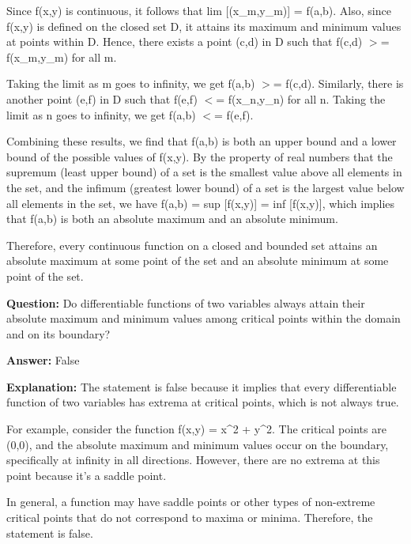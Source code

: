 \documentclass{article}
\begin{document}
Since f(x,y) is continuous, it follows that lim [(x\_m,y\_m)] = f(a,b). Also, since f(x,y) is defined on the closed set D, it attains its maximum and minimum values at points within D. Hence, there exists a point (c,d) in D such that f(c,d) \ensuremath{>}= f(x\_m,y\_m) for all m.

Taking the limit as m goes to infinity, we get f(a,b) \ensuremath{>}= f(c,d). Similarly, there is another point (e,f) in D such that f(e,f) \ensuremath{<}= f(x\_n,y\_n) for all n. Taking the limit as n goes to infinity, we get f(a,b) \ensuremath{<}= f(e,f).

Combining these results, we find that f(a,b) is both an upper bound and a lower bound of the possible values of f(x,y). By the property of real numbers that the supremum (least upper bound) of a set is the smallest value above all elements in the set, and the infimum (greatest lower bound) of a set is the largest value below all elements in the set, we have f(a,b) = sup [f(x,y)] = inf [f(x,y)], which implies that f(a,b) is both an absolute maximum and an absolute minimum.

Therefore, every continuous function on a closed and bounded set attains an absolute maximum at some point of the set and an absolute minimum at some point of the set.
                
                \vspace{0.5cm} 
        
            
                \textbf {Question:} Do differentiable functions of two variables always attain their absolute maximum and minimum values among critical points within the domain and on its boundary?
                
                \textbf{Answer:} False

                \textbf{Explanation:} The statement is false because it implies that every differentiable function of two variables has extrema at critical points, which is not always true.

For example, consider the function f(x,y) = x{\textasciicircum}2 + y{\textasciicircum}2. The critical points are (0,0), and the absolute maximum and minimum values occur on the boundary, specifically at infinity in all directions. However, there are no extrema at this point because it's a saddle point.

In general, a function may have saddle points or other types of non-extreme critical points that do not correspond to maxima or minima. Therefore, the statement is false.
                
\end{document}
